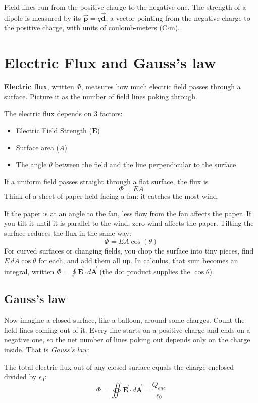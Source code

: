 Field lines run from the positive charge to the negative one. The
strength of a dipole is measured by its 
$\vec{\mathbf{p}} = q\vec{\mathbf{d}}$, a vector pointing from the
negative charge to the positive charge, with units of coulomb-meters
(C$\cdot$m).


\section{Electric Flux and Gauss's law}
\textbf{Electric flux}, written $\Phi$, measures how
much electric field passes through a surface. Picture it as the number of
field lines poking through.

The electric flux depends on 3 factors:
\begin{itemize}
	\item Electric Field Strength ($\mathbf E$)
	\item Surface area ($A$)
	\item The angle $\theta$ between the field and the line perpendicular to the surface
\end{itemize}

If a uniform field passes straight through a flat surface, the flux is
\begin{equation}
	\Phi = EA
	\label{eq:elec_flux_perp}
\end{equation}
Think of a sheet of paper held facing a fan: it catches the most wind.

If the paper is at an angle to the fan, less flow from the fan affects the paper. If you tilt it until it is parallel to the wind, zero wind affects the paper. Tilting the surface reduces the flux in the same way:
\begin{equation}
	\Phi = EA\cos(\theta)
	\label{eq:elec_flux_angle}
\end{equation}
For curved surfaces or changing fields, you chop the surface into tiny
pieces, find $E\,dA\cos\theta$ for each, and add them all up. In calculus,
that sum becomes an integral, written $\Phi = \oint \vec{\mathbf{E}} \cdot d\vec{\mathbf{A}}$
(the dot product supplies the $\cos\theta$).
\subsection{Gauss's law}
Now imagine a closed surface, like a balloon, around some charges. Count
the field lines coming out of it. Every line starts on a positive charge
and ends on a negative one, so the net number of lines poking out depends
only on the charge inside. That is \textit{Gauss's law}:
\begin{mdframed}[style=important, frametitle={Gauss's Law}]
The total electric flux out of any closed surface equals the charge
enclosed divided by $\epsilon_0$:
\begin{equation}
		\Phi = \oiint \vec{\textbf{E}} \cdot d\vec{\textbf{A}} = \frac{Q_{enc}}{\epsilon_0}
\end{equation}
\end{mdframed}

